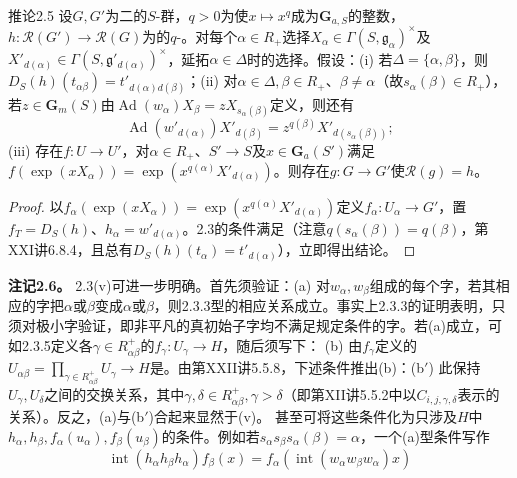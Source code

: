 \begin{SGAresult}{推论}{2.5}
设$G,G'$为二的$S$-群，$q>0$为使$x\mapsto x^q$成为$\mathbf G_{a,S}$的整数，$h:\mathcal R(G')\to\mathcal R(G)$为的$q$-。对每个$\alpha\in R_+$选择$X_\alpha\in\Gamma(S,\mathfrak g_\alpha)^\times$及$X'_{d(\alpha)}\in\Gamma(S,\mathfrak g'_{d(\alpha)})^\times$，延拓$\alpha\in\Delta$时的选择。假设：(i) 若$\Delta=\{\alpha,\beta\}$，则$D_S(h)(t_{\alpha\beta})=t'_{d(\alpha)d(\beta)}$；(ii) 对$\alpha\in\Delta,\beta\in R_+$、$\beta\ne\alpha$（故$s_\alpha(\beta)\in R_+$），若$z\in\mathbf G_m(S)$由$\operatorname{Ad}(w_\alpha)X_\beta=zX_{s_\alpha(\beta)}$定义，则还有
\[\operatorname{Ad}(w'_{d(\alpha)})X'_{d(\beta)}=z^{q(\beta)}X'_{d(s_\alpha(\beta))};\]
(iii) 存在$f:U\to U'$，对$\alpha\in R_+$、$S'\to S$及$x\in\mathbf G_a(S')$满足$f(\exp(xX_\alpha))=\exp(x^{q(\alpha)}X'_{d(\alpha)})$。则存在$g:G\to G'$使$\mathcal R(g)=h$。
\end{SGAresult}
\begin{proof}
以$f_\alpha(\exp(xX_\alpha))=\exp(x^{q(\alpha)}X'_{d(\alpha)})$定义$f_\alpha:U_\alpha\to G'$，置$f_T=D_S(h)$、$h_\alpha=w'_{d(\alpha)}$。2.3的条件满足（注意$q(s_\alpha(\beta))=q(\beta)$，第XXI讲6.8.4，且总有$D_S(h)(t_\alpha)=t'_{d(\alpha)}$），立即得出结论。
\end{proof}
\textbf{注记2.6。} 2.3(v)可进一步明确。首先须验证：(a) 对$w_\alpha,w_\beta$组成的每个字，若其相应的字把$\alpha$或$\beta$变成$\alpha$或$\beta$，则2.3.3型的相应关系成立。事实上2.3.3的证明表明，只须对极小字验证，即非平凡的真初始子字均不满足规定条件的字。若(a)成立，可如2.3.5定义各$\gamma\in R^+_{\alpha\beta}$的$f_\gamma:U_\gamma\to H$，随后须写下：
(b) 由$f_\gamma$定义的$U_{\alpha\beta}=\prod_{\gamma\in R^+_{\alpha\beta}}U_\gamma\to H$是。由第XXII讲5.5.8，下述条件推出(b)：(b$'$) 此保持$U_\gamma,U_\delta$之间的交换关系，其中$\gamma,\delta\in R^+_{\alpha\beta},\gamma>\delta$（即第XII讲5.5.2中以$C_{i,j,\gamma,\delta}$表示的关系）。反之，(a)与(b$'$)合起来显然于(v)。
甚至可将这些条件化为只涉及$H$中$h_\alpha,h_\beta,f_\alpha(u_\alpha),f_\beta(u_\beta)$的条件。例如若$s_\alpha s_\beta s_\alpha(\beta)=\alpha$，一个(a)型条件写作
\[\operatorname{int}(h_\alpha h_\beta h_\alpha)f_\beta(x)=f_\alpha(\operatorname{int}(w_\alpha w_\beta w_\alpha)x)\tag{1}\]

